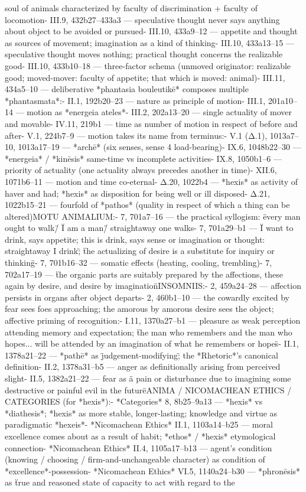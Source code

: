 {soul of animals characterized by faculty of discrimination + faculty of locomotion\n- III.9, 432b27–433a3 — speculative thought never says anything about object to be avoided or pursued\n- III.10, 433a9–12 — appetite and thought as sources of movement; imagination as a kind of thinking\n- III.10, 433a13–15 — speculative thought moves nothing; practical thought concerns the realizable good\n- III.10, 433b10–18 — three-factor schema (unmoved originator: realizable good; moved-mover: faculty of appetite; that which is moved: animal)\n- III.11, 434a5–10 — deliberative *phantasia bouleutikē* composes multiple *phantasmata*\n\nPHYSICS:\n- II.1, 192b20–23 — nature as principle of motion\n- III.1, 201a10–14 — motion as *energeia ateles*\n- III.2, 202a13–20 — single actuality of mover and movable\n- IV.11, 219b1 — time as number of motion in respect of before and after\n- V.1, 224b7–9 — motion takes its name from terminus\n\nMETAPHYSICS:\n- V.1 (Δ.1), 1013a7–10, 1013a17–19 — *archē* (six senses, sense 4 load-bearing)\n- IX.6, 1048b22–30 — *energeia* / *kinēsis* same-time vs incomplete activities\n- IX.8, 1050b1–6 — priority of actuality (one actuality always precedes another in time)\n- XII.6, 1071b6–11 — motion and time co-eternal\n- Δ.20, 1022b4 — *hexis* as activity of haver and had; *hexis* as disposition for being well or ill disposed\n- Δ.21, 1022b15–21 — fourfold of *pathos* (quality in respect of which a thing can be altered)\n\nDE MOTU ANIMALIUM:\n- 7, 701a7–16 — the practical syllogism: \"every man ought to walk\" / \"I am a man\" / straightaway one walks\n- 7, 701a29–b1 — \"I want to drink, says appetite; this is drink, says sense or imagination or thought: straightaway I drink\"; \"the actualizing of desire is a substitute for inquiry or thinking\"\n- 7, 701b16–32 — somatic effects (heating, cooling, trembling)\n- 7, 702a17–19 — \"the organic parts are suitably prepared by the affections, these again by desire, and desire by imagination\"\n\nDE INSOMNIIS:\n- 2, 459a24–28 — affection persists in organs after object departs\n- 2, 460b1–10 — the cowardly excited by fear sees foes approaching; the amorous by amorous desire sees the object; affective priming of recognition\n\nRHETORIC:\n- I.11, 1370a27–b1 — pleasure as weak perception attending memory and expectation; \"the man who remembers and the man who hopes... will be attended by an imagination of what he remembers or hopes\"\n- II.1, 1378a21–22 — *pathē* as \"judgement-modifying\"; the *Rhetoric*'s canonical definition\n- II.2, 1378a31–b5 — anger as definitionally arising from perceived slight\n- II.5, 1382a21–22 — fear as \"a pain or disturbance due to imagining some destructive or painful evil in the future\"\n\nDE ANIMA / NICOMACHEAN ETHICS / CATEGORIES (for *hexis*):\n- *Categories* 8, 8b25–9a13 — *hexis* vs *diathesis*; *hexis* as more stable, longer-lasting; knowledge and virtue as paradigmatic *hexeis*\n- *Nicomachean Ethics* II.1, 1103a14–b25 — moral excellence comes about as a result of habit; *ethos* / *hexis* etymological connection\n- *Nicomachean Ethics* II.4, 1105a17–b13 — agent's condition (knowing / choosing / firm-and-unchangeable character) as condition of *excellence*-possession\n- *Nicomachean Ethics* VI.5, 1140a24–b30 — *phronēsis* as \"true and reasoned state of capacity to act with regard to the }
